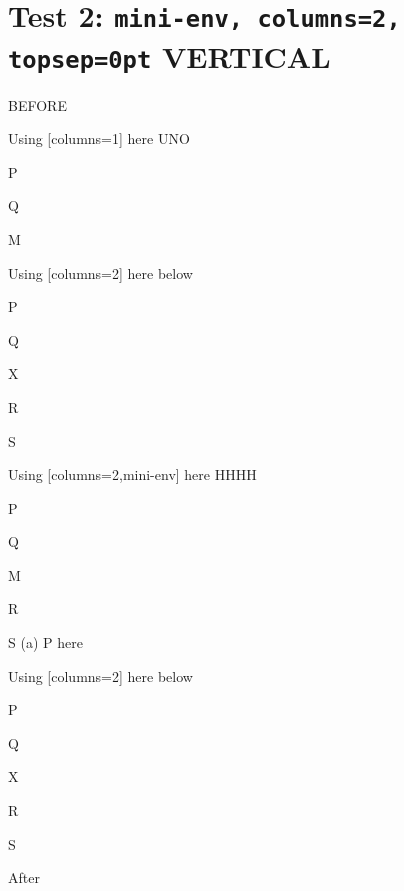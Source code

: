 \documentclass[12pt]{article}
\begin{document}
\newpage

\section{Test 2: \texttt{mini-env, columns=2, topsep=0pt} VERTICAL}

BEFORE
\begin{enumext}[columns=2]
\item Using [columns=1] here UNO

  \begin{enumext}[columns=1,topsep=0pt]%
     \item  P \item Q \item M %
  \end{enumext}

\item Using [columns=2] here below

\begin{enumext}[columns=2]%
     \item  P \item Q \item X  \item R \item S
  \end{enumext}

\columnbreak

\item Using [columns=2,mini-env] here HHHH

  \begin{enumext}[columns=2,mini-env={0.4\linewidth},topsep=0pt]%
    \item  P \item Q \item M \item R \item S
    \miniright
    (a) P here
  \end{enumext}

\item Using [columns=2] here below

\begin{enumext}[columns=2]%
     \item  P \item Q \item X  \item R \item S
  \end{enumext}

\end{enumext}
After
\end{document}
